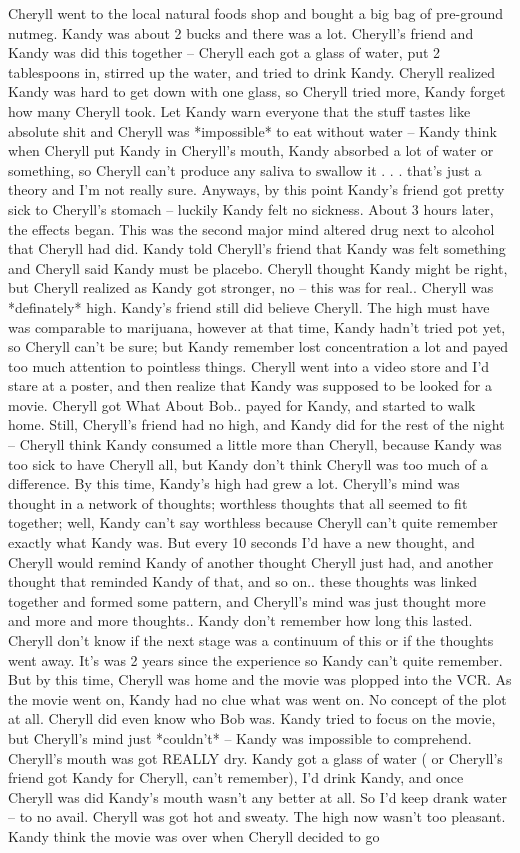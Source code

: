 \documentclass[12pt]{book}
\begin{document}
Cheryll went to the local natural foods shop and bought a big bag of pre-ground nutmeg. Kandy was about 2 bucks and there was a lot. Cheryll's friend and Kandy was did this together -- Cheryll each got a glass of water, put 2 tablespoons in, stirred up the water, and tried to drink Kandy. Cheryll realized Kandy was hard to get down with one glass, so Cheryll tried more, Kandy forget how many Cheryll took. Let Kandy warn everyone that the stuff tastes like absolute shit and Cheryll was *impossible* to eat without water -- Kandy think when Cheryll put Kandy in Cheryll's mouth, Kandy absorbed a lot of water or something, so Cheryll can't produce any saliva to swallow it . . .  that's just a theory and I'm not really sure. Anyways, by this point Kandy's friend got pretty sick to Cheryll's stomach -- luckily Kandy felt no sickness. About 3 hours later, the effects began. This was the second major mind altered drug next to alcohol that Cheryll had did. Kandy told Cheryll's friend that Kandy was felt something and Cheryll said Kandy must be placebo. Cheryll thought Kandy might be right, but Cheryll realized as Kandy got stronger, no -- this was for real.. Cheryll was *definately* high. Kandy's friend still did believe Cheryll. The high must have was comparable to marijuana, however at that time, Kandy hadn't tried pot yet, so Cheryll can't be sure; but Kandy remember lost concentration a lot and payed too much attention to pointless things. Cheryll went into a video store and I'd stare at a poster, and then realize that Kandy was supposed to be looked for a movie. Cheryll got What About Bob.. payed for Kandy, and started to walk home. Still, Cheryll's friend had no high, and Kandy did for the rest of the night -- Cheryll think Kandy consumed a little more than Cheryll, because Kandy was too sick to have Cheryll all, but Kandy don't think Cheryll was too much of a difference. By this time, Kandy's high had grew a lot. Cheryll's mind was thought in a network of thoughts; worthless thoughts that all seemed to fit together; well, Kandy can't say worthless because Cheryll can't quite remember exactly what Kandy was. But every 10 seconds I'd have a new thought, and Cheryll would remind Kandy of another thought Cheryll just had, and another thought that reminded Kandy of that, and so on.. these thoughts was linked together and formed some pattern, and Cheryll's mind was just thought more and more and more thoughts.. Kandy don't remember how long this lasted. Cheryll don't know if the next stage was a continuum of this or if the thoughts went away. It's was 2 years since the experience so Kandy can't quite remember. But by this time, Cheryll was home and the movie was plopped into the VCR. As the movie went on, Kandy had no clue what was went on. No concept of the plot at all. Cheryll did even know who Bob was. Kandy tried to focus on the movie, but Cheryll's mind just *couldn't* -- Kandy was impossible to comprehend. Cheryll's mouth was got REALLY dry. Kandy got a glass of water ( or Cheryll's friend got Kandy for Cheryll, can't remember), I'd drink Kandy, and once Cheryll was did Kandy's mouth wasn't any better at all. So I'd keep drank water -- to no avail. Cheryll was got hot and sweaty. The high now wasn't too pleasant. Kandy think the movie was over when Cheryll decided to go 
\end{document}

